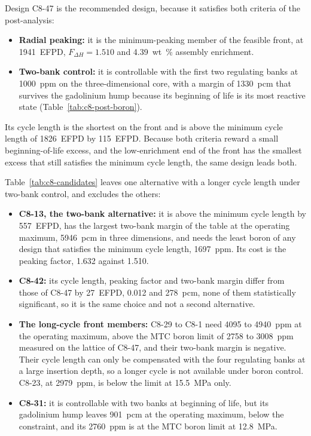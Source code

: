 Design C8-47 is the recommended design, because it satisfies
both criteria of the post-analysis:

\begin{itemize}
  \item \textbf{Radial peaking:} it is the minimum-peaking member of the
        feasible front, at \SI{1941}{EFPD}, $F_{\Delta H} = 1.510$ and
        \SI{4.39}{wt\%} assembly enrichment.

  \item \textbf{Two-bank control:} it is controllable with the first two
        regulating banks at \SI{1000}{ppm} on the three-dimensional
        core, with a margin of \SI{1330}{pcm} that survives the
        gadolinium hump because its beginning of life is its most
        reactive state (Table~\ref{tab:c8-post-boron}).
\end{itemize}

Its cycle length is the shortest on the front and is above the minimum
cycle length of \SI{1826}{EFPD} by
\SI{115}{EFPD}. Because both criteria reward a small beginning-of-life
excess, and the low-enrichment end of the front has the smallest excess
that still satisfies the minimum cycle length, the same design leads both.

Table~\ref{tab:c8-candidates} leaves one alternative with a longer
cycle length under two-bank control, and excludes the others:

\begin{itemize}
  \item \textbf{C8-13, the two-bank alternative:} it is above the
minimum cycle length by \SI{557}{EFPD}, has the largest two-bank
        margin of the table at the operating maximum, \SI{5946}{pcm} in
        three dimensions, and needs the least boron of any design that
        satisfies the minimum cycle length, \SI{1697}{ppm}. Its cost is the peaking
        factor, 1.632 against 1.510.

  \item \textbf{C8-42:} its cycle length, peaking factor and two-bank
        margin differ from those of C8-47 by \SI{27}{EFPD}, 0.012 and
        \SI{278}{pcm}, none of them statistically significant, so it is
        the same choice and not a second alternative.

  \item \textbf{The long-cycle front members:} C8-29 to C8-1 need 4095
        to \SI{4940}{ppm} at the operating maximum, above the MTC boron
        limit of 2758 to \SI{3008}{ppm} measured on the lattice of
        C8-47, and their two-bank margin is negative. Their cycle length
        can only be compensated with the four regulating banks at a
        large insertion depth, so a longer cycle is not available under
        boron control. C8-23, at \SI{2979}{ppm}, is below the limit at
        \SI{15.5}{MPa} only.

  \item \textbf{C8-31:} it is controllable with two banks at beginning
        of life, but its gadolinium hump leaves \SI{901}{pcm} at the
        operating maximum, below the constraint, and its
        \SI{2760}{ppm} is at the MTC boron limit at \SI{12.8}{MPa}.
\end{itemize}


